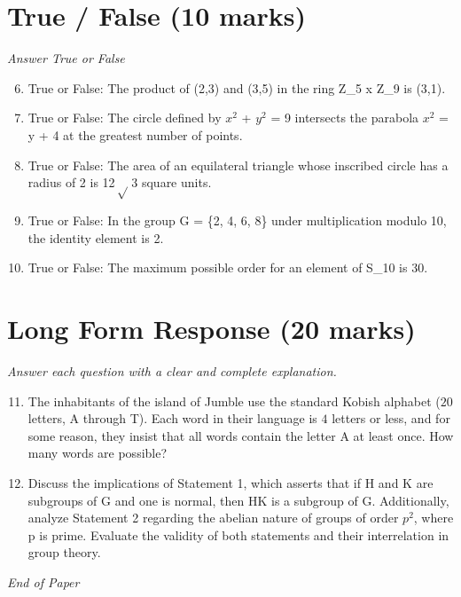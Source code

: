 \documentclass[12pt]{article}
\begin{document}
\section*{True / False (10 marks)}
\textit{Answer True or False}
\begin{enumerate}[label=\arabic*.]
\setcounter{enumi}{5}
\item True or False: The product of (2,3) and (3,5) in the ring Z\_5 x Z\_9 is (3,1).
\item True or False: The circle defined by $x^2$ + $y^2$ = 9 intersects the parabola $x^2$ = y + 4 at the greatest number of points.
\item True or False: The area of an equilateral triangle whose inscribed circle has a radius of 2 is 12\ensuremath{\sqrt} 3 square units.
\item True or False: In the group G = \{2, 4, 6, 8\} under multiplication modulo 10, the identity element is 2.
\item True or False: The maximum possible order for an element of S\_10 is 30.
\end{enumerate}

\section*{Long Form Response (20 marks)}
\textit{Answer each question with a clear and complete explanation.}
\begin{enumerate}[label=\arabic*.]
\setcounter{enumi}{10}
\item The inhabitants of the island of Jumble use the standard Kobish alphabet ($20$ letters, A through T). Each word in their language is $4$ letters or less, and for some reason, they insist that all words contain the letter A at least once. How many words are possible?
\item Discuss the implications of Statement 1, which asserts that if H and K are subgroups of G and one is normal, then HK is a subgroup of G. Additionally, analyze Statement 2 regarding the abelian nature of groups of order $p^2$, where p is prime. Evaluate the validity of both statements and their interrelation in group theory.
\end{enumerate}

\vfill
\noindent\textit{End of Paper}
\end{document}
